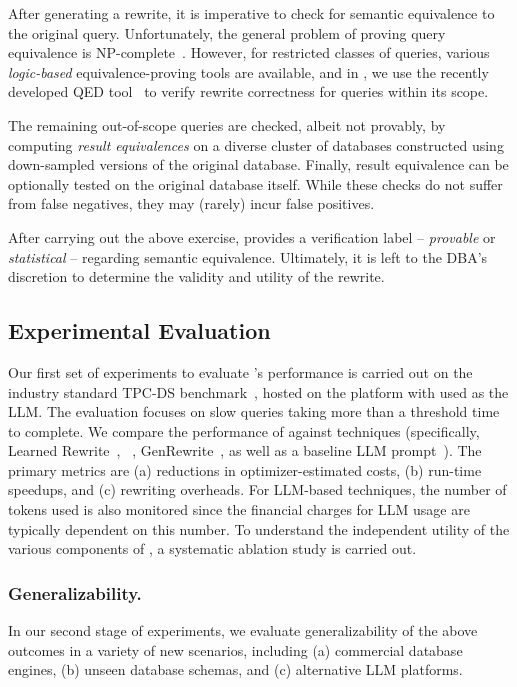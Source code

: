 After generating a rewrite, it is imperative to check for semantic equivalence to the original query. Unfortunately, the general problem of proving query equivalence is NP-complete~\cite{queryequivalence}. However, for restricted classes of queries, various \emph{logic-based} equivalence-proving tools are available, and
in \lithe, we use the recently developed QED tool~\cite{QED} to verify rewrite correctness for queries within its scope.

The remaining out-of-scope queries are checked, albeit not provably, by computing \emph{result equivalences} on a diverse cluster of databases constructed using down-sampled versions of the original database. Finally, result equivalence can be optionally tested on the original database itself. While these checks do not suffer from false negatives, they may (rarely) incur false positives. 

After carrying out the above exercise, \lithe provides a verification label -- \emph{provable} or \emph{statistical} -- regarding semantic equivalence. Ultimately, it is left to the DBA's discretion to determine the validity and utility of the rewrite.


\subsection*{Experimental Evaluation}
Our first set of experiments to evaluate {\lithe}'s performance is carried out on the industry standard TPC-DS benchmark~\cite{tpcds}, hosted on the \pg platform with \gpt used as the LLM. The evaluation focuses on slow queries taking more than a threshold time to complete. We compare the performance of \lithe against \sota techniques (specifically, Learned Rewrite~\cite{Learned_Rewrite}, \llmrsq~\cite{LLMR2}, GenRewrite~\cite{Genrewrite}, as well as a baseline LLM prompt~\cite{Genrewrite}).  The primary metrics are (a) reductions in optimizer-estimated costs, (b) run-time speedups, and (c) rewriting overheads. For LLM-based techniques, the number of tokens used is also monitored since the financial charges for LLM usage are typically dependent on this number. To understand the independent utility of the various components of \lithe, a systematic ablation study is carried out.
\subsubsection*{Generalizability.} In our second stage of experiments, we evaluate generalizability of the above outcomes in a variety of new scenarios, including (a) commercial database engines, (b) unseen database schemas, and (c) alternative LLM platforms. 

